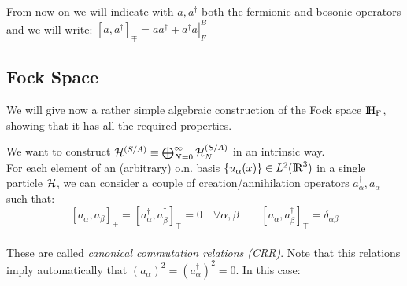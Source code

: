 From now on we will indicate with $a,a^\dag$ both the fermionic and bosonic operators and we will write: $\left[a,a^\dag\right]_{\mp} = \left. aa^\dag \mp a^\dag a\right|_F^B$

\subsection{Fock Space}

We will give now a rather simple algebraic construction of the Fock space $\rm I\!H_F$, showing that it has all the required properties.

We want to construct $\mathcal{H}^{(S/A)} \equiv \bigoplus_{N=0}^\infty \mathcal{H}_N^{(S/A)}$ in an intrinsic way.\\
For each element of an (arbitrary) o.n. basis $\left\{u_\alpha(x)\right\} \in L^2({\rm I\!R}^3)$ in a single particle $\mathcal{H}$, we can consider a couple of creation/annihilation operators $a_\alpha^\dag, a_\alpha$ such that:
$$ \left[a_\alpha, a_\beta \right]_\mp = \left[a^\dag_\alpha, a_\beta ^\dag\right]_\mp = 0 \quad \forall \alpha, \beta \qquad \left[a_\alpha, a_\beta^\dag\right]_\mp = \delta_{\alpha\beta}$$
\\
These are called \textit{canonical commutation relations (CRR)}. Note that this relations imply automatically that $(a_\alpha)^2 = (a_\alpha^\dag)^2 = 0$. In this case:
